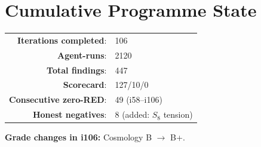 \documentclass[11pt,a4paper]{article}
\begin{document}
\section{Cumulative Programme State}

\begin{center}
\begin{tabular}{rl}
\toprule
\textbf{Iterations completed}: & 106 \\
\textbf{Agent-runs}: & 2120 \\
\textbf{Total findings}: & 447 \\
\textbf{Scorecard}: & 127/10/0 \\
\textbf{Consecutive zero-RED}: & 49 (i58--i106) \\
\textbf{Honest negatives}: & 8 (added: $S_8$ tension) \\
\bottomrule
\end{tabular}
\end{center}

\textbf{Grade changes in i106:} Cosmology B $\to$ B+.
\end{document}
